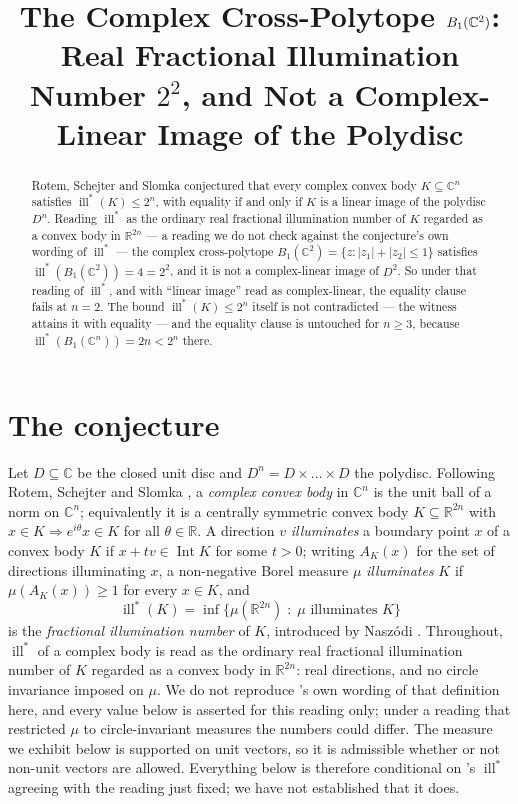 \documentclass[11pt]{amsart}
\title[The complex cross-polytope at $n=2$]{The Complex Cross-Polytope
\texorpdfstring{$B_{1}(\CC^{2})$}{B1(C2)}: Real Fractional Illumination Number
\texorpdfstring{$2^{2}$}{2^2}, and Not a Complex-Linear Image of the Polydisc}
\date{}
\theoremstyle{remark}
\DeclareMathOperator{\ill}{ill}
\DeclareMathOperator{\Int}{Int}
\newcommand{\CC}{\mathbb{C}}
\newcommand{\RR}{\mathbb{R}}
\newcommand{\illstar}{\ill^{*}}
\begin{document}
\begin{abstract}
Rotem, Schejter and Slomka conjectured that every complex convex body
$K\subseteq\CC^{n}$ satisfies $\illstar(K)\le 2^{n}$, with equality if and only
if $K$ is a linear image of the polydisc $D^{n}$. Reading $\illstar$ as the
ordinary real fractional illumination number of $K$ regarded as a convex body in
$\RR^{2n}$ --- a reading we do not check against the conjecture's own wording of
$\illstar$ --- the complex cross-polytope
$B_{1}(\CC^{2})=\{z:|z_{1}|+|z_{2}|\le 1\}$ satisfies
$\illstar(B_{1}(\CC^{2}))=4=2^{2}$, and it is not a complex-linear image of
$D^{2}$. So under that reading of $\illstar$, and with ``linear image'' read as
complex-linear, the equality clause fails at $n=2$. The bound
$\illstar(K)\le 2^{n}$ itself is not contradicted --- the witness attains
it with equality --- and the equality clause is untouched for $n\ge 3$, because
$\illstar(B_{1}(\CC^{n}))=2n<2^{n}$ there.
\end{abstract}

\maketitle

\section{The conjecture}\label{sec:conj}

Let $D\subseteq\CC$ be the closed unit disc and $D^{n}=D\times\dots\times D$ the
polydisc. Following Rotem, Schejter and Slomka \cite{RSS}, a \emph{complex
convex body} in $\CC^{n}$ is the unit ball of a norm on $\CC^{n}$; equivalently
it is a centrally symmetric convex body $K\subseteq\RR^{2n}$ with
$x\in K\Rightarrow e^{i\theta}x\in K$ for all $\theta\in\RR$. A direction
$v$ \emph{illuminates} a boundary point $x$ of a convex body $K$ if
$x+tv\in\Int K$ for some $t>0$; writing $A_{K}(x)$ for the set of directions
illuminating $x$, a non-negative Borel measure $\mu$ \emph{illuminates} $K$ if
$\mu(A_{K}(x))\ge 1$ for every $x\in K$, and
\[
  \illstar(K)=\inf\bigl\{\mu(\RR^{2n})\;:\;\mu\text{ illuminates }K\bigr\}
\]
is the \emph{fractional illumination number} of $K$, introduced by
Nasz\'odi \cite{Naszodi}. Throughout, $\illstar$ of a complex body is read as the
ordinary real fractional illumination number of $K$ regarded as a convex body in
$\RR^{2n}$: real directions, and no circle invariance imposed on $\mu$. We do not
reproduce \cite{RSS}'s own wording of that definition here, and every value below
is asserted for this reading only; under a reading that restricted $\mu$ to
circle-invariant measures the numbers could differ. The measure we exhibit below
is supported on unit vectors, so it is admissible whether or not non-unit vectors
are allowed. Everything below is therefore conditional on \cite{RSS}'s $\illstar$
agreeing with the reading just fixed; we have not established that it does.
\end{document}
